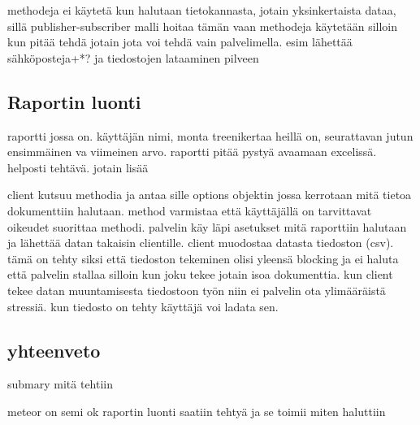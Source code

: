 
methodeja ei käytetä kun halutaan tietokannasta, jotain yksinkertaista dataa, sillä publisher-subscriber malli hoitaa tämän
vaan methodeja käytetään silloin kun pitää tehdä jotain jota voi tehdä vain palvelimella. esim lähettää sähköposteja+*? ja tiedostojen lataaminen pilveen 
\medskip



\subsection*{Raportin luonti}

raportti jossa on. käyttäjän nimi, monta treenikertaa heillä on, seurattavan jutun ensimmäinen va viimeinen arvo.
raportti pitää pystyä avaamaan excelissä.
helposti tehtävä. jotain lisää
\medskip


client kutsuu methodia ja antaa sille options objektin jossa kerrotaan mitä tietoa dokumenttiin halutaan. method varmistaa että käyttäjällä on tarvittavat oikeudet suorittaa methodi.
palvelin käy läpi asetukset mitä raporttiin halutaan ja lähettää datan takaisin clientille.
client muodostaa datasta tiedoston (csv). tämä on tehty siksi että tiedoston tekeminen olisi yleensä blocking ja ei haluta että palvelin stallaa silloin kun joku tekee jotain isoa dokumenttia.
kun client tekee datan muuntamisesta tiedostoon työn niin ei palvelin ota ylimääräistä stressiä.
kun tiedosto on tehty käyttäjä voi ladata sen.
\medskip


\subsection*{yhteenveto}
submary mitä tehtiin

meteor on semi ok
raportin luonti saatiin tehtyä ja se toimii miten haluttiin

